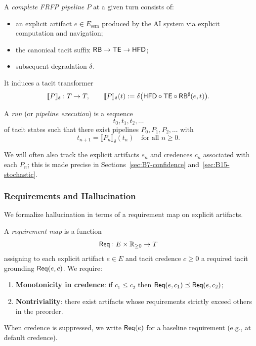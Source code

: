 \begin{definition}
A \emph{complete FRFP pipeline} \(P\) at a given turn consists of:
\begin{itemize}
  \item an explicit artifact \(e \in E_{\mathrm{sem}}\) produced by the
        AI system via explicit computation and navigation;
  \item the canonical tacit suffix \(\mathsf{RB} \to \mathsf{TE} \to \mathsf{HFD}\);
  \item subsequent degradation \(\delta\).
\end{itemize}
It induces a tacit transformer
\[
\llbracket P \rrbracket_\delta : T \to T,\qquad
\llbracket P \rrbracket_\delta(t)
 :=
 \delta\bigl( \mathsf{HFD}\circ\mathsf{TE}\circ\mathsf{RB}^\sharp(e,t)\bigr).
\]
\end{definition}

\begin{definition}[Run]
A \emph{run} (or \emph{pipeline execution}) is a sequence
\[
t_0, t_1, t_2,\dots
\]
of tacit states such that there exist pipelines
\(P_0, P_1, P_2,\dots\) with
\[
t_{n+1}
  = \llbracket P_n \rrbracket_\delta(t_n)
\quad\text{for all } n \geq 0.
\]
\end{definition}

We will often also track the explicit artifacts \(e_n\) and credences
\(c_n\) associated with each \(P_n\); this is made precise in
Sections~\ref{sec:B7-confidence} and~\ref{sec:B15-stochastic}.

\subsubsection{Requirements and Hallucination}

We formalize hallucination in terms of a requirement map on explicit
artifacts.

\begin{definition}
A \emph{requirement map} is a function
\[
\mathsf{Req} : E \times \mathbb{R}_{\ge 0} \to T
\]
assigning to each explicit artifact \(e \in E\) and tacit credence
\(c\ge 0\) a required tacit grounding \(\mathsf{Req}(e,c)\). We require:
\begin{enumerate}
  \item \textbf{Monotonicity in credence}:
        if \(c_1 \le c_2\) then
        \(\mathsf{Req}(e,c_1) \preceq \mathsf{Req}(e,c_2)\);
  \item \textbf{Nontriviality}:
        there exist artifacts whose requirements strictly exceed others
        in the preorder.
\end{enumerate}
When credence is suppressed, we write \(\mathsf{Req}(e)\) for a baseline
requirement (e.g., at default credence).
\end{definition}

